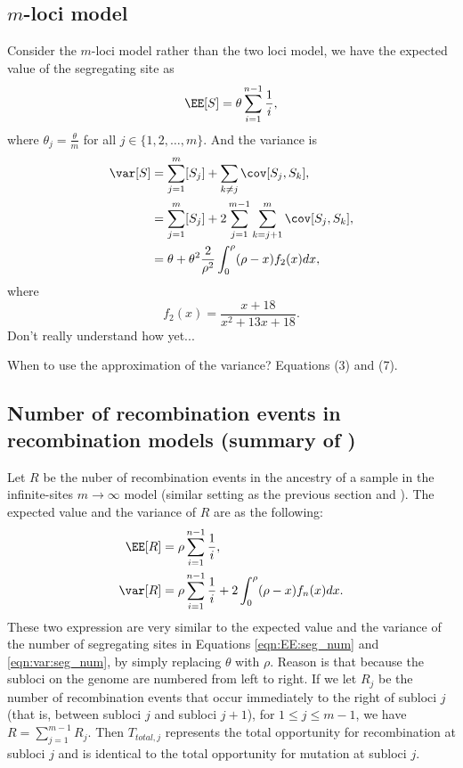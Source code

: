 \subsection{$m$-loci model}
Consider the $m$-loci model rather than the two loci model, we have the expected value of the segregating site as 
\begin{equation}
\EE[S]=\theta\sum_{i=1}^{n-1}\frac{1}{i},\label{eqn:EE:seg_num}
\end{equation} where $\theta_j=\frac{\theta}{m}$ for all $j\in \{1,2,\dots,m\}$.
And the variance is 
\begin{align}
\var[S]&=\sum^m_{j=1}[S_j]+\sum_{k\neq j}\cov[S_j,S_k],\notag\\
&=\sum^m_{j=1}[S_j]+2\sum^{m-1}_{j=1}\sum^m_{k=j+1}\cov[S_j,S_k],\notag\\
&=\theta+\theta^2\frac{2}{\rho^2}\int^\rho_0(\rho-x)f_2(x)dx,\label{eqn:var:seg_num}
\end{align}
where 
\begin{equation}
f_2(x)=\frac{x+18}{x^2+13x+18}.\label{f2x}
\end{equation} {\color{red} Don't really understand how yet...}


{\color{red} When to use the approximation of the variance? \citet{Hudson1983TPB} Equations (3) and (7).}

\subsection{Number of recombination events in recombination models (summary of \citet{Hudson1985})}

Let $R$ be the nuber of recombination events in the ancestry of a sample in the infinite-sites $m\rightarrow\infty$ model (similar setting as the previous section and \citet{Hudson1983TPB}). The expected value and the variance of $R$ are as the following:
\begin{align}
\EE[R]&=\rho \sum^{n-1}_{i=1}\frac{1}{i},\label{eqn:EE:recomb_num}\\
\var[R]&=\rho\sum^{n-1}_{i=1}\frac{1}{i}+2\int^\rho_0(\rho-x)f_n(x)dx.\label{eqn:var:recomb_num}
\end{align} 
These two expression are very similar to the expected value and the variance of the number of segregating sites in Equations \eqref{eqn:EE:seg_num} and \eqref{eqn:var:seg_num}, by simply replacing $\theta$ with $\rho$. Reason is that because the subloci on the genome are numbered from left to right. If we let $R_j$ be the number of recombination events that occur immediately to the right of subloci $j$ (that is, between subloci $j$ and subloci $j+1$), for $1\leq j\leq m-1$, we have $R=\sum^{m-1}_{j=1}R_j$. Then $T_{total,j}$ represents the total opportunity for recombination at subloci $j$ and is identical to the total opportunity for mutation at subloci $j$.


